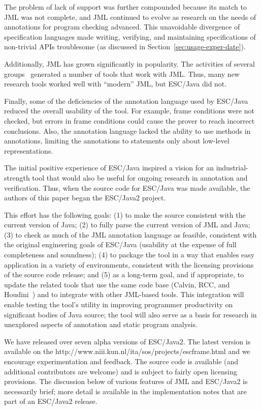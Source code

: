 \documentclass{llncs}
\begin{document}
The problem of lack of support was further compounded because its
match to JML was not complete, and JML continued to evolve as research
on the needs of annotations for program checking advanced.  This
unavoidable divergence of specification languages made writing,
verifying, and maintaining specifications of non-trivial APIs
troublesome (as discussed in Section~\ref{sec:usage-exper-date}).

Additionally, JML has grown significantly in popularity.  The
activities of
several
groups~\cite{jmlpapers,Burdy-etal03,Leavens-etal00,NimmerErnst01,Bogor03}
generated a number of tools that work with JML.
Thus, many new research tools worked well with ``modern'' JML, but
ESC/Java did not.

Finally, some of the deficiencies of the annotation language used by
ESC/Java reduced the overall usability of the tool.  For example,
frame conditions were not checked, but errors in frame conditions
could cause the prover to reach incorrect conclusions.  Also, the
annotation language lacked the ability to use methods in annotations,
limiting the annotations to statements only about low-level
representations.

The initial positive experience of ESC/Java inspired a vision for an
industrial-strength tool that would also be useful for ongoing
research in annotation and verification.  Thus, when the source code
for ESC/Java was made available, the authors of this paper began the
ESC/Java2 project.

This effort has the following goals:
(1) to make the source consistent with the current version of Java;
(2) to fully parse the current version of JML and Java;
(3) to check as much of the JML annotation language as feasible,
consistent with the original engineering goals of ESC/Java
(usability at the expense of full completeness and soundness);
(4) to package the tool in a way that enables easy application in a
variety of environments, consistent with the licensing provisions of
the source code release; and
(5) as a long-term goal, and if appropriate, to update the related
tools that use the same code base (Calvin, RCC, and
Houdini~\cite{flanagan01houdini}) and to integrate with other
JML-based tools.  This integration will enable testing the tool's
utility in improving programmer productivity on significant bodies of
Java source; the tool will also serve as a basis for research in
unexplored aspects of annotation and static program analysis.
  
We have released over seven alpha versions of ESC/Java2.  The latest
version is available on the 
{http://www.niii.kun.nl/ita/sos/projects/escframe.html} and we
encourage experimentation and feedback.  The source code is available
(and additional contributors are welcome) and is subject to fairly
open licensing provisions.  The discussion below of various features
of JML and ESC/Java2 is necessarily brief; more detail is available in
the implementation notes that are part of an ESC/Java2 release.
\end{document}

